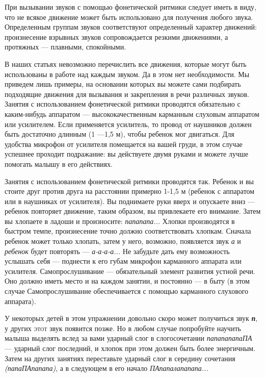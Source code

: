 \documentclass[a5paper]{book}
\renewcommand{\emph}[1]{\textit{#1}}
\begin{document}
При вызывании звуков с помощью фонетической ритмики следует иметь в
виду, что не всякое движение может быть использовано для получения
любого звука. Определенным группам звуков соответствуют определенный
характер движений: произнесение взрывных звуков сопровождается резкими
движениями, а протяжных --- плавными, спокойными.

В наших статьях невозможно перечислить все движения, которые могут быть
использованы в работе над каждым звуком. Да в этом нет необходимости. Мы
приведем лишь примеры, на основании которых вы можете сами подбирать
подходящие движения для вызывания и закрепления в речи различных звуков.
Занятия с использованием фонетической ритмики проводятся обязательно с
каким-нибудь аппаратом --- высококачественным карманным слуховым
аппаратом или усилителем. Если применяется усилитель, то провод от
наушников должен быть достаточно длинным (1 ---1,5 м), чтобы ребенок мог
двигаться. Для удобства микрофон от усилителя помещается на вашей груди,
в этом случае успешнее проходит подражание: вы действуете двумя руками и
можете лучше помогать малышу в его действиях.

Занятия с использованием фонетической ритмики проводятся так. Ребенок и
вы стоите друг против друга на расстоянии примерно 1-1,5 м (ребенок с
аппаратом или в наушниках от усилителя). Вы поднимаете руки вверх и
опускаете вниз --- ребенок повторяет движение, таким образом, вы
привлекаете его внимание. Затем вы хлопаете в ладоши и произносите:
\emph{папапапа...} Хлопки производятся в быстром темпе, произнесение
точно должно соответствовать хлопкам. Сначала ребенок может только
хлопать, затем у него, возможно, появляется звук \emph{а} и
\emph{ребенок} будет повторять --- \emph{а-а-а-а...} Не забудьте дать
ему возможность услышать себя --- поднести к его губам микрофон
карманного аппарата или усилителя. Самопрослушивание --- обязательный
элемент развития устной речи. Оно должно иметь место и на каждом
занятии, и постоянно --- в быту (в этом случае Самопрослушивание
обеспечивается с помощью карманного слухового аппарата).

У некоторых детей в этом упражнении довольно скоро может получиться звук
\emph{\textbf{п}}, у других \textsc{этот} звук появится позже. Но в
любом случае попробуйте научить малыша выделять вслед за вами ударный
слог в слогосочетании \emph{папапапапаПА} --- ударный слог последний, и
хлопок при этом должен быть более энергичным. Затем на других занятиях
переставьте ударный слог в середину сочетания \emph{(папаПАпапапа)}, а в
следующем в его начало \emph{ПАпапалапапапа...}
\end{document}
